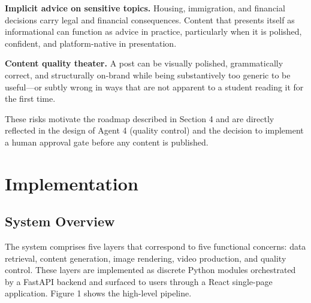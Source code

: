 \documentclass[12pt, letterpaper]{article}
\begin{document}
\textbf{Implicit advice on sensitive topics.} Housing, immigration, and financial
decisions carry legal and financial consequences. Content that presents itself as
informational can function as advice in practice, particularly when it is polished,
confident, and platform-native in presentation.

\textbf{Content quality theater.} A post can be visually polished, grammatically
correct, and structurally on-brand while being substantively too generic to be
useful---or subtly wrong in ways that are not apparent to a student reading it for
the first time.

These risks motivate the roadmap described in Section 4 and are directly reflected in
the design of Agent 4 (quality control) and the decision to implement a human approval
gate before any content is published.

\newpage

\section{Implementation}

\subsection{System Overview}

The system comprises five layers that correspond to five functional concerns: data
retrieval, content generation, image rendering, video production, and quality control.
These layers are implemented as discrete Python modules orchestrated by a FastAPI
backend and surfaced to users through a React single-page application. Figure 1 shows
the high-level pipeline.
\end{document}
